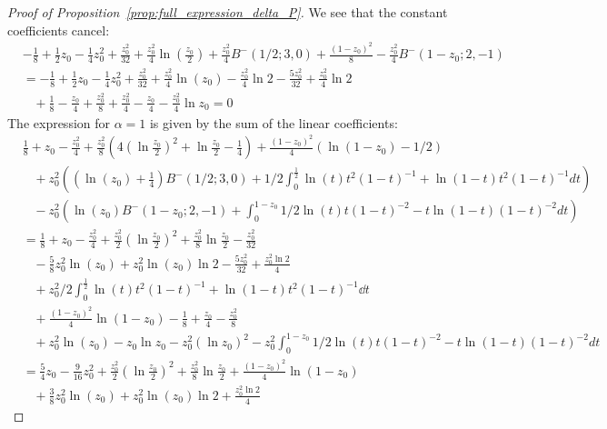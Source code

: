 \begin{proof}[Proof of Proposition~\ref{prop:full_expression_delta_P}]
We see that the constant coefficients cancel:
\begin{align*}
&-\frac{1}{8}+\frac{1}{2}z_0-\frac{1}{4}z_0^2+\frac{z_0^2}{32}+\frac{z_0^2}{4}\ln(\frac{z_0}{2}) +\frac{z_0^2}{4}B^-(1/2;3,0)+\frac{(1-z_0)^2}{8}-\frac{z_0^2}{4}B^-(1-z_0;2,-1) \\
&=-\frac{1}{8}+\frac{1}{2}z_0-\frac{1}{4}z_0^2+\frac{z_0^2}{32}+\frac{z_0^2}{4}\ln(z_0)-\frac{z_0^2}{4}\ln 2 -\frac{5z_0^2}{32}+\frac{z_0^2}{4}\ln2 \\ &\hspace{10pt}+\frac{1}{8}-\frac{z_0}{4}+\frac{z_0^2}{8}+\frac{z_0^2}{4}-\frac{z_0}{4}-\frac{z_0^2}{4}\ln z_0 =0
\end{align*}
The expression for $\alpha=1$ is given by the sum of the linear coefficients:
\begin{align*}
	&\frac{1}{8}+z_0-\frac{z_0^2}{4}+\frac{z_0^2}{8}(4(\ln\frac{z_0}{2})^2+\ln\frac{z_0}{2} - \frac{1}{4}) 
		+\frac{(1-z_0)^2}{4} (\ln(1-z_0)-1/2 )\\
	&\hspace{10pt}+z_0^2\left(\left(\ln(z_0)+\frac{1}{4}\right) B^-(1/2;3,0)+1/2\int_0^{\frac{1}{2}} 
		\ln(t)t^2(1-t)^{-1}+\ln(1-t)t^2(1-t)^{-1}dt \right) \\
	&\hspace{10pt}- z_0^{2}\left(\ln(z_0)B^-(1-z_0;2,-1)+\int_0^{1-z_0} 1/2\ln(t)t(1-t)^{-2}-t\ln(1-t)(1-t)^{-2}dt \right) \\
	&=\frac{1}{8}+z_0-\frac{z_0^2}{4}+\frac{z_0^2}{2}(\ln\frac{z_0}{2})^2
		+\frac{z_0^2}{8}\ln\frac{z_0}{2} - \frac{z_0^2}{32} \\
	&\hspace{10pt}-\frac{5}{8}z_0^2\ln(z_0)+z_0^2\ln(z_0)\ln 2-\frac{5z_0^2}{32} +\frac{z_0^2 \ln2}{4}\\
	&\hspace{10pt}+z_0^2/2\int_0^{\frac{1}{2}} \ln(t)t^2(1-t)^{-1}+\ln(1-t)t^2(1-t)^{-1}\dd t \\
	&\hspace{10pt}+\frac{(1-z_0)^2}{4}\ln(1-z_0) -\frac{1}{8}+\frac{z_0}{4}-\frac{z_0^2}{8}\\
	&\hspace{10pt}+ z_0^2\ln(z_0)-z_0 \ln z_0-z_0^2(\ln z_0)^2
		-z_0^2\int_0^{1-z_0} 1/2\ln(t)t(1-t)^{-2}-t\ln(1-t)(1-t)^{-2}dt \\
	&=\frac{5}{4}z_0-\frac{9}{16}z_0^2 +\frac{z_0^2}{2}(\ln\frac{z_0}{2})^2+\frac{z_0^2}{8}\ln\frac{z_0}{2} 
		+\frac{(1-z_0)^2}{4}\ln(1-z_0) \\
	&\hspace{10pt}+\frac{3}{8}z_0^2\ln(z_0)+z_0^2\ln(z_0)\ln 2+\frac{z_0^2 \ln2}{4}

\end{align*}
\end{proof}
